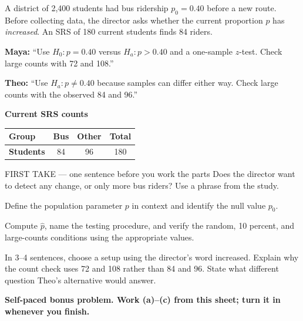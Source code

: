 \documentclass[14pt]{extarticle}
\begin{document}
\pagestyle{empty}


\noindent\begin{minipage}[t]{0.57\linewidth}
\vspace{0pt}
A district of 2{,}400 students had bus ridership $p_0=0.40$ before a new route. Before collecting data, the director asks whether the current proportion $p$ has \emph{increased}. An SRS of 180 current students finds 84 riders.\par\smallskip \textbf{Maya:} ``Use $H_0:p=0.40$ versus $H_a:p>0.40$ and a one-sample $z$-test. Check large counts with 72 and 108.''\par \textbf{Theo:} ``Use $H_a:p\neq0.40$ because samples can differ either way. Check large counts with the observed 84 and 96.''\par
\end{minipage}\hfill
\begin{minipage}[t]{0.40\linewidth}
\vspace{0pt}
\begin{center}
\textbf{Current SRS counts}\par\smallskip
\begin{tabular}{|l|c|c|c|}
\hline
\textbf{Group} & \textbf{Bus} & \textbf{Other} & \textbf{Total} \\ \hline
\textbf{Students} & 84 & 96 & 180 \\ \hline
\end{tabular}
\end{center}
\end{minipage}

\begin{firsttakebox}{FIRST TAKE --- one sentence before you work the parts}
Does the director want to detect any change, or only more bus riders? Use a phrase from the study.
\end{firsttakebox}

\begin{description}[leftmargin=1.15in, labelwidth=1in, itemsep=2pt, topsep=2pt]
  \item[\dokbadge{1}~(a)] Define the population parameter $p$ in context and identify the null value $p_0$.
  \item[\dokbadge{2}~(b)] Compute $\hat p$, name the testing procedure, and verify the random, 10 percent, and large-counts conditions using the appropriate values.
  \item[\dokbadge{3}~(c)] In 3--4 sentences, choose a setup using the director's word increased. Explain why the count check uses 72 and 108 rather than 84 and 96. State what different question Theo's alternative would answer.
\end{description}

\vfill
\textbf{Self-paced bonus problem. Work (a)--(c) from this sheet; turn it in whenever you finish.}
\end{document}
